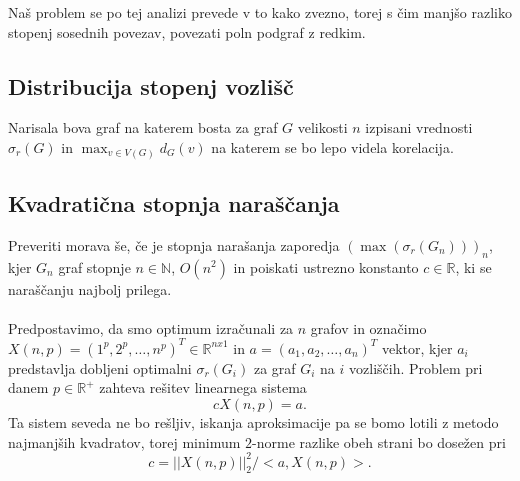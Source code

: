 \documentclass[ letterpaper, titlepage, fleqn]{article}
\begin{document}
Naš problem se po tej analizi prevede v to kako zvezno, torej s čim manjšo razliko stopenj sosednih povezav, 
povezati poln podgraf z redkim.

\subsection{Distribucija stopenj vozlišč}
Narisala bova graf na katerem bosta za graf $G$ velikosti $n$ izpisani
vrednosti $\sigma_r(G)$ in $\max_{v \in V(G)}d_G(v)$ na katerem
se bo lepo videla korelacija.

\subsection{Kvadratična stopnja naraščanja}
Preveriti morava še, če je stopnja narašanja zaporedja
$(\max(\sigma_r(G_n)))_n$, kjer $G_n$ graf stopnje $n \in \mathbb{N}$,
$O(n^2)$ in poiskati ustrezno konstanto $c \in \mathbb{R}$, ki 
se naraščanju najbolj prilega.
\\\\
Predpostavimo, da smo optimum izračunali za $n$ grafov in
označimo $X(n, p) = (1^p, 2^p, \dots, n^p)^T \in \mathbb{R}^{nx1}$ 
in $a = (a_1, a_2, \dots, a_n)^T$ vektor, kjer $a_i$ predstavlja
dobljeni optimalni $\sigma_r(G_i)$ za graf $G_i$ na $i$ vozliščih.
Problem pri danem $p \in \mathbb{R}^{+}$ zahteva rešitev linearnega sistema 
$$cX(n, p) = a.$$
Ta sistem seveda ne bo rešljiv, iskanja aproksimacije pa se bomo
lotili z metodo najmanjših kvadratov, torej minimum $2$-norme
razlike obeh strani bo dosežen pri
$$c = ||X(n, p)||_{2}^2 / <a, X(n, p)>.$$
\end{document}
